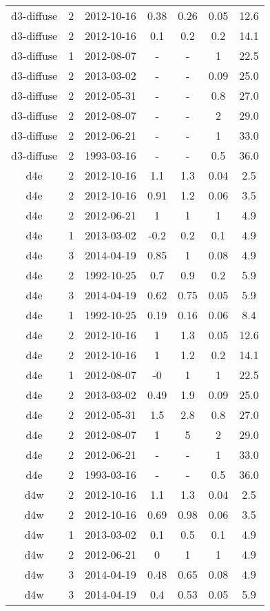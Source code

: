 \begin{table*}[htp]
\begin{tabular}{ccccccc}
d3-diffuse & 2 & 2012-10-16 & 0.38 & 0.26 & 0.05 & 12.6 \\
d3-diffuse & 2 & 2012-10-16 & 0.1 & 0.2 & 0.2 & 14.1 \\
d3-diffuse & 1 & 2012-08-07 & - & - & 1 & 22.5 \\
d3-diffuse & 2 & 2013-03-02 & - & - & 0.09 & 25.0 \\
d3-diffuse & 2 & 2012-05-31 & - & - & 0.8 & 27.0 \\
d3-diffuse & 2 & 2012-08-07 & - & - & 2 & 29.0 \\
d3-diffuse & 2 & 2012-06-21 & - & - & 1 & 33.0 \\
d3-diffuse & 2 & 1993-03-16 & - & - & 0.5 & 36.0 \\
d4e & 2 & 2012-10-16 & 1.1 & 1.3 & 0.04 & 2.5 \\
d4e & 2 & 2012-10-16 & 0.91 & 1.2 & 0.06 & 3.5 \\
d4e & 2 & 2012-06-21 & 1 & 1 & 1 & 4.9 \\
d4e & 1 & 2013-03-02 & -0.2 & 0.2 & 0.1 & 4.9 \\
d4e & 3 & 2014-04-19 & 0.85 & 1 & 0.08 & 4.9 \\
d4e & 2 & 1992-10-25 & 0.7 & 0.9 & 0.2 & 5.9 \\
d4e & 3 & 2014-04-19 & 0.62 & 0.75 & 0.05 & 5.9 \\
d4e & 1 & 1992-10-25 & 0.19 & 0.16 & 0.06 & 8.4 \\
d4e & 2 & 2012-10-16 & 1 & 1.3 & 0.05 & 12.6 \\
d4e & 2 & 2012-10-16 & 1 & 1.2 & 0.2 & 14.1 \\
d4e & 1 & 2012-08-07 & -0 & 1 & 1 & 22.5 \\
d4e & 2 & 2013-03-02 & 0.49 & 1.9 & 0.09 & 25.0 \\
d4e & 2 & 2012-05-31 & 1.5 & 2.8 & 0.8 & 27.0 \\
d4e & 2 & 2012-08-07 & 1 & 5 & 2 & 29.0 \\
d4e & 2 & 2012-06-21 & - & - & 1 & 33.0 \\
d4e & 2 & 1993-03-16 & - & - & 0.5 & 36.0 \\
d4w & 2 & 2012-10-16 & 1.1 & 1.3 & 0.04 & 2.5 \\
d4w & 2 & 2012-10-16 & 0.69 & 0.98 & 0.06 & 3.5 \\
d4w & 1 & 2013-03-02 & 0.1 & 0.5 & 0.1 & 4.9 \\
d4w & 2 & 2012-06-21 & 0 & 1 & 1 & 4.9 \\
d4w & 3 & 2014-04-19 & 0.48 & 0.65 & 0.08 & 4.9 \\
d4w & 3 & 2014-04-19 & 0.4 & 0.53 & 0.05 & 5.9 \\

\end{tabular}
\end{table*}
